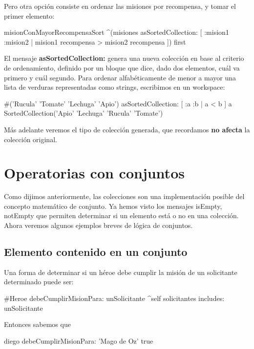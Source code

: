 \documentclass[a4paper,12pt]{book}
\begin{document}
Pero otra opción consiste en ordenar las misiones por recompensa, y tomar el primer elemento:

\begin{code}
misionConMayorRecompensaSort
   ^(misiones asSortedCollection: [ :mision1 :mision2 | mision1 recompensa > mision2 recompensa ])
       first
\end{code}

El mensaje \textbf{asSortedCollection:} genera una nueva colección en base al criterio de ordenamiento, definido
por un bloque que dice, dado dos elementos, cuál va primero y cuál segundo. Para ordenar alfabéticamente
de menor a mayor una lista de verduras representadas como strings, escribimos en un workspace: 

\begin{code}
#('Rucula' 'Tomate' 'Lechuga' 'Apio') asSortedCollection: [ :a :b | a < b ]
    a SortedCollection('Apio' 'Lechuga' 'Rucula' 'Tomate')
\end{code}

Más adelante veremos el tipo de colección generada, que recordamos \textbf{no afecta} la colección original.

\section{Operatorias con conjuntos}

Como dijimos anteriormente, las colecciones son una implementación posible del concepto matemático de conjunto.
Ya hemos visto los mensajes isEmpty, notEmpty que permiten determinar si un elemento está o no en una colección.
Ahora veremos algunos ejemplos breves de lógica de conjuntos.

\subsection{Elemento contenido en un conjunto}
Una forma de determinar si un héroe debe cumplir la misión de un solicitante determinado puede ser:

\begin{code}
#Heroe
debeCumplirMisionPara: unSolicitante
    ^self solicitantes includes: unSolicitante
\end{code}

Entonces sabemos que

\begin{code}
diego debeCumplirMisionPara: 'Mago de Oz'
    true
\end{code}
\end{document}
